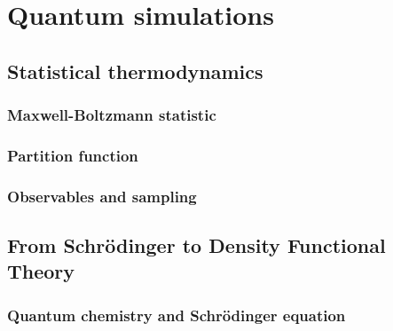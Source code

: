 \documentclass[thesis]{subfiles}
\begin{document}
\OnlyInSubfile{\setcounter{chapter}{2}}

\chapter{Quantum simulations}
\startcontents[chapters]
\printpartialtoc

\section{Statistical thermodynamics}


\subsection{Maxwell-Boltzmann statistic}

\subsection{Partition function}

\subsection{Observables and sampling}

\section{From Schrödinger to Density Functional Theory}

\subsection{Quantum chemistry and Schrödinger equation}
\end{document}
